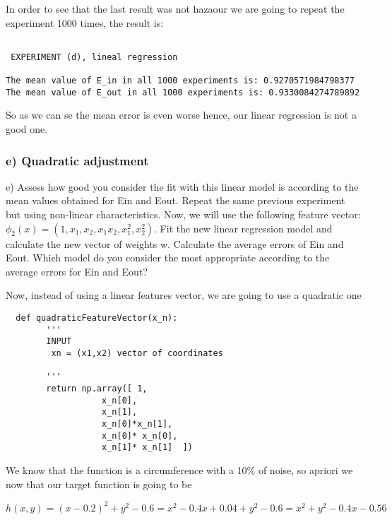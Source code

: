 In order to see that the last result was not hazaour we are going to repeat the experiment 1000 times, the result is:

\begin{verbatim}

 EXPERIMENT (d), lineal regression

The mean value of E_in in all 1000 experiments is: 0.9270571984798377
The mean value of E_out in all 1000 experiments is: 0.9330084274789892

\end{verbatim}


So as we can se the mean error is even worse hence, our linear regression is not a good one.

\subsubsection{e) Quadratic adjustment}

e) Assess how good you consider the fit with this linear model is according to the mean values obtained for Ein and Eout. Repeat the same previous experiment but using non-linear characteristics. Now, we will use the following feature vector: $\phi_2(x) =(1,x_1,x_2,x_1 x_2, x_1^2, x_2^2)$. Fit the new linear regression model and calculate the new vector of weights w. Calculate the average errors of Ein and Eout. Which model do you consider the most appropriate according to the average errors for Ein and Eout?



Now, instead of using a linear features vector, we are going to use a quadratic one

\begin{verbatim}
  def quadraticFeatureVector(x_n):
        '''
        INPUT 
         xn = (x1,x2) vector of coordinates 
        
        '''
        return np.array([ 1,
                   x_n[0],
                   x_n[1],
                   x_n[0]*x_n[1],
                   x_n[0]* x_n[0],
                   x_n[1]* x_n[1]  ])

                 \end{verbatim}

                 We know that the function is a circumference with a 10\% of noise, so apriori we now that our target function is going to be

               
                 $$h(x,y) = (x-0.2)^2 + y^2 -0.6 = x^2 - 0.4x + 0.04 + y^2 - 0.6 = x^2 + y^2 - 0.4x - 0.56$$

